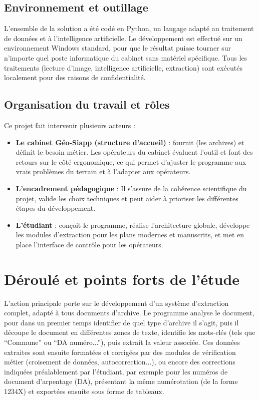 \documentclass[a4paper,11pt]{article}
\begin{document}
\subsection{Environnement et outillage}

L'ensemble de la solution a été codé en Python, un langage adapté au traitement de données et à l'intelligence artificielle. Le développement est effectué sur un environnement Windows standard, pour que le résultat puisse tourner sur n'importe quel poste informatique du cabinet sans matériel spécifique. Tous les traitements (lecture d'image, intelligence artificielle, extraction) sont exécutés localement pour des raisons de confidentialité.

\subsection{Organisation du travail et rôles}
Ce projet fait intervenir plusieurs acteurs :
\begin{itemize}[leftmargin=1.2em]
  \item \textbf{Le cabinet Géo-Siapp (structure d'accueil)} : fournit (les archives) et définit le besoin métier. Les opérateurs du cabinet évaluent l'outil et font des retours sur le côté ergonomique, ce qui permet d'ajuster le programme aux vrais problèmes du terrain et à l'adapter aux opérateurs.
  \item \textbf{L'encadrement pédagogique} : Il s'assure de la cohérence scientifique du projet, valide les choix techniques et peut aider à prioriser les différentes étapes du développement.
  \item \textbf{ L'étudiant} : conçoit le programme, réalise l'architecture globale, développe les modules d'extraction pour les plans modernes et manuscrits, et met en place l'interface de contrôle pour les opérateurs. 
\end{itemize}

\section{Déroulé et points forts de l'étude}

L'action principale porte sur le développement d'un système d'extraction complet, adapté à tous documents d'archive. Le programme analyse le document, pour dans un premier temps identifier de quel type d'archive il s'agit, puis il découpe le document en différentes zones de texte, identifie les mots-clés (tels que \enquote{Commune} ou \enquote{DA numéro...}), puis extrait la valeur associée. Ces données extraites sont ensuite formatées et corrigées par des modules de vérification métier (croisement de données, autocorrection...), ou encore des corrections indiquées préalablement par l'étudiant, par exemple pour les numéros de document d'arpentage (DA), présentant la même numérotation (de la forme 1234X) et exportées ensuite sous forme de tableaux.
\end{document}
